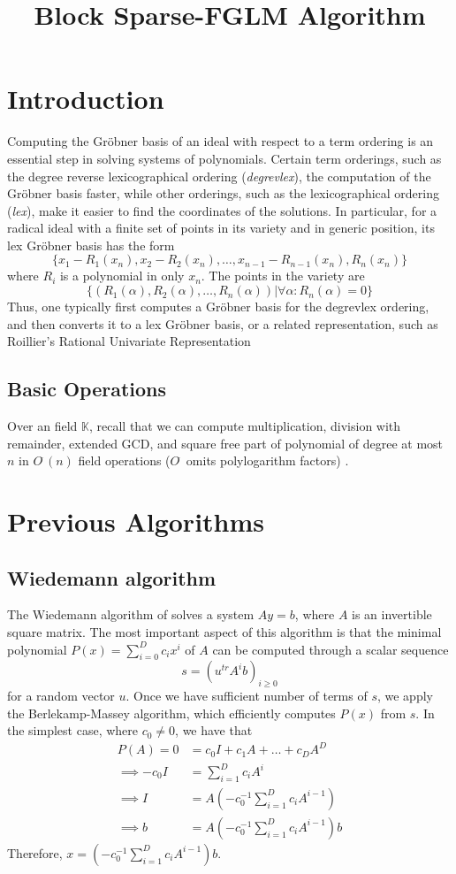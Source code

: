 \documentclass[12pt]{article}
\title{Block Sparse-FGLM Algorithm}
\begin{document}
\tableofcontents
\pagebreak

\section{Introduction}
Computing the Gr\"obner basis of an ideal with respect to a term
ordering is an essential step in solving systems of polynomials. 
Certain term orderings, such as the degree reverse lexicographical 
ordering (\textit{degrevlex}), the computation of the Gr\"obner basis
faster, while other orderings, such as the lexicographical ordering
(\textit{lex}), make it easier to find the coordinates of the solutions.
In particular, for a radical ideal with a finite set of points in its variety
and in generic position, its lex Gr\"obner basis has the form
$$ \{  x_1 - R_1(x_n), x_2-R_2(x_n),\dots, x_{n-1}-R_{n-1}(x_n), R_n(x_n)  \}$$
where $R_i$ is a polynomial in only $x_n$. The points in the variety are
$$\{ ( R_1(\alpha), R_2(\alpha), \dots, R_n(\alpha)  ) |\forall \alpha: R_n(\alpha)=0  \}$$
Thus, one typically first computes a Gr\"obner basis for the degrevlex ordering,
and then converts it to a lex Gr\"obner basis, or a related representation, such as 
Roillier's Rational Univariate Representation \cite{Rouillier99}

\subsection{Basic Operations}
Over an field $\mathbb{K}$,
recall that we can compute multiplication,
division with remainder, extended GCD, and square free part
of polynomial of degree at most $n$ in $O^{\tilde{~}}(n)$
field operations ($O^{\tilde{~}}$ omits polylogarithm factors)
\cite{GaGe13}. 





\newpage
\section{Previous Algorithms}

\subsection{Wiedemann algorithm}
The Wiedemann algorithm of \cite{Wiedemann86} solves a system
$Ay = b$, where $A$ is an invertible square matrix. The most
important aspect of this algorithm is that the minimal polynomial
$P(x) = \sum_{i = 0}^{D} c_i x^i$ of $A$ can be computed
through a scalar sequence
$$ s = (u^{tr}A^ib)_{i \ge 0}$$
for a random vector $u$. Once we have sufficient number of terms
of $s$, we apply the Berlekamp-Massey algorithm, which efficiently
computes $P(x)$ from $s$.
In the simplest case, where $c_0 \neq 0$, we have that
\begin{align*}
P(A) = 0 &= c_0 I + c_1A + \dots + c_D A^D \\
\implies -c_0 I &= \sum_{i=1}^{D}c_iA^i \\
\implies I &= A(-c_0^{-1} \sum_{i=1}^{D}c_iA^{i-1})\\
\implies b &= A(-c_0^{-1} \sum_{i=1}^{D}c_iA^{i-1})b
\end{align*}
Therefore, $x = (-c_0^{-1} \sum_{i=1}^{D}c_iA^{i-1})b$.
\end{document}
